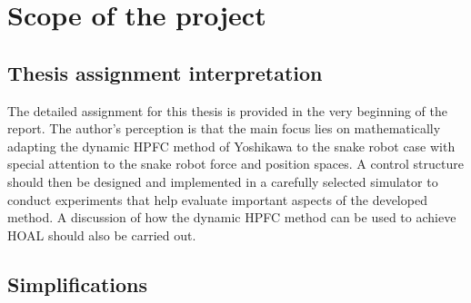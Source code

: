 \section{Scope of the project}

\subsection{Thesis assignment interpretation}

The detailed assignment for this thesis is provided in the very beginning of the report. The author's perception is that the main focus lies on mathematically adapting the dynamic HPFC method of Yoshikawa \cite{yoshikawa1987dynamic} to the snake robot case with special attention to the snake robot force and position spaces. A control structure should then be designed and implemented in a carefully selected simulator to conduct experiments that help evaluate important aspects of the developed method. A discussion of how the dynamic HPFC method can be used to achieve HOAL should also be carried out.





\subsection{Simplifications}

